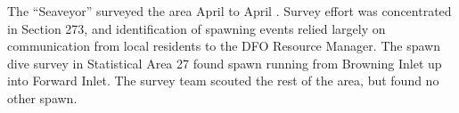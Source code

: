 The ``Seaveyor'' surveyed the area April  to April .
Survey effort was concentrated in Section 273, and identification of spawning events relied largely on communication from local residents to the DFO Resource Manager.
The spawn dive survey in Statistical Area 27 found spawn running from Browning Inlet up into Forward Inlet.
The survey team scouted the rest of the area, but found no other spawn. 